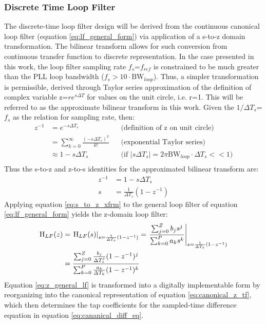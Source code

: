 \subsubsection{Discrete Time Loop Filter}\label{lf-discretization}
	The discrete-time loop filter design will be derived from the continuous canonical loop filter (equation \ref{eq:lf_general_form}) via application of a s-to-z domain transformation. The bilinear transform \cite{proakis_1993_bilinear} allows for such conversion from continuous transfer function to discrete representation. In the case presented in this work, the loop filter sampling rate $f_s$=$f_{ref}$ is constrained to be much greater than the PLL loop bandwidth ($f_s > 10\cdot\mathrm{BW}_{loop}$). Thus, a simpler transformation is permissible, derived through Taylor series approximation of the definition of complex variable z=$re^{s\Delta T}$ \cite{proakis_1993_z} for values on the unit circle, i.e. r=1. This will be referred to as the approximate bilinear transform in this work. Given the $1/\Delta T_s$=$f_{s}$ as the relation for sampling rate, then:
	\begin{align*}
		z^{-1} &= e^{-s\Delta T_s} && \text{(definition of z on unit circle)} \\
		&= \sum_{k=0}^\infty\frac{(-s\Delta T_s)^k}{k!} && \text{(exponential Taylor series)} \\
		&\approx 1-s\Delta T_s &&\text{(if $|s\Delta T_s| = 2\pi\mathrm{BW}_{loop}\cdot \Delta T_s << 1$)} \\
	\end{align*}
	Thus the s-to-z and z-to-s identities for the approximated bilinear transform are:
	\begin{align}
		z^{-1} &= 1-s\Delta T_s\\
		s &= \frac{1}{\Delta T_s}(1-z^{-1}) \label{eq:s_to_z_xfrm}
	\end{align}
	Applying equation \ref{eq:s_to_z_xfrm} to the general loop filter of equation \ref{eq:lf_general_form} yields the z-domain loop filter:
	\begin{align}
		\textnormal{H}_{LF}(z) &= \left.\textnormal{H}_{LF}(s)\right\vert_{s=\frac{1}{\Delta T_s}(1-z^{-1})} = \left.\frac{\sum_{j=0}^Z b_js^j}{\sum_{k=0}^P a_ks^k}\right\vert_{s=\frac{1}{\Delta T_s}(1-z^{-1})}\\
		&= \frac{\sum_{j=0}^Z \frac{b_j}{\Delta T_s^j}(1-z^{-1})^j}{\sum_{k=0}^P \frac{a_k}{\Delta T_k}(1-z^{-1})^k} \label{eq:z_general_lf}
	\end{align}
	Equation \ref{eq:z_general_lf} is transformed into a digitally implementable form by reorganizing into the canonical representation of equation \ref{eq:canonical_z_tf}, which then determines the tap coefficients for the sampled-time difference equation in equation \ref{eq:cananical_diff_eq}. 
